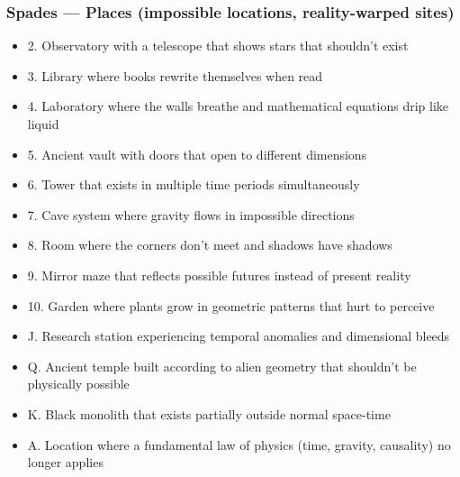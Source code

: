 \documentclass[11pt]{article}
\begin{document}
\subsubsection{Spades — Places (impossible locations, reality-warped sites)}
\begin{itemize}[leftmargin=*]
\item 2. Observatory with a telescope that shows stars that shouldn't exist
\item 3. Library where books rewrite themselves when read
\item 4. Laboratory where the walls breathe and mathematical equations drip like liquid
\item 5. Ancient vault with doors that open to different dimensions
\item 6. Tower that exists in multiple time periods simultaneously
\item 7. Cave system where gravity flows in impossible directions
\item 8. Room where the corners don't meet and shadows have shadows
\item 9. Mirror maze that reflects possible futures instead of present reality
\item 10. Garden where plants grow in geometric patterns that hurt to perceive
\item J. Research station experiencing temporal anomalies and dimensional bleeds
\item Q. Ancient temple built according to alien geometry that shouldn't be physically possible
\item K. Black monolith that exists partially outside normal space-time
\item A. Location where a fundamental law of physics (time, gravity, causality) no longer applies
\end{itemize}
\end{document}
